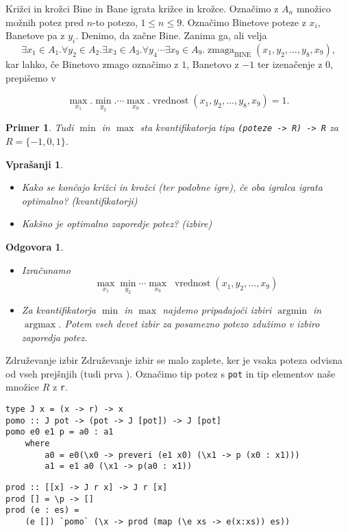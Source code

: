 \documentclass{beamer}
\newtheorem{vpr}{Vprašanji}
\newtheorem{odg}{Odgovora}
\newtheorem{prim}{Primer}
\def\obs{\exists}
\def\fora{\forall}
\newcommand{\argmin}{\operatorname{argmin}}
\newcommand{\argmax}{\operatorname{argmax}}
\begin{document}
\begin{frame}{Križci in krožci}
Bine in Bane igrata križce in krožce. Označimo z $A_n$ množico možnih potez pred $n$-to potezo, $1\leq n\leq 9$.
Označimo Binetove poteze z $x_i$, Banetove pa z $y_i$. Denimo, da začne Bine.  Zanima ga, ali velja
$$\obs x_1\in A_1.\fora y_2 \in A_2. \obs x_3\in A_3.\fora y_4 \cdots \obs x_9 \in A_9. \operatorname{zmaga}_\text{BINE}(x_1,y_2,\dots, y_8,x_9) \text{,}$$
\pause
kar lahko, če Binetovo zmago označimo z $1$, Banetovo z $-1$ ter izenačenje z $0$, prepišemo v

$$\max_{x_1}. \min_{y_2}. \cdots \max_{x_9}. \operatorname{vrednost}(x_1, y_2,\dots, y_8, x_9) = 1\text{.}$$

\begin{prim}
Tudi $\min$ in $\max$ sta kvantifikatorja tipa \texttt{(poteze -> R) -> R} za $R = \{-1, 0, 1\}$.
\end{prim}

\end{frame}

\begin{frame}
\begin{vpr}
	\begin{itemize}
	\item Kako se končajo križci in krožci (ter podobne igre), če oba igralca igrata optimalno? (kvantifikatorji)
	\item Kakšno je optimalno zaporedje potez? (izbire)
	\end{itemize}
\end{vpr}
\pause
\begin{odg}
	\begin{itemize}
	\item Izračunamo $$\max_{x_1}\min_{y_2}\cdots \max_{x_9}\;\operatorname{vrednost}(x_1, y_2,\dots, x_9)$$
	\item Za kvantifikatorja $\min$ in $\max$ najdemo pripadajoči izbiri $\argmin$ in $\argmax$. Potem vseh devet izbir
	za posamezno potezo zdužimo v izbiro zaporedja potez.
	\end{itemize}
\end{odg}

\end{frame}

\begin{frame}[fragile]{Združevanje izbir}%
Združevanje izbir se malo zaplete, ker je vsaka poteza odvisna od vseh prejšnjih (tudi prva \smiley).
Označimo tip potez s \texttt{pot} in tip elementov naše množice $R$ z \texttt{r}.
\begin{lstlisting}
type J x = (x -> r) -> x
pomo :: J pot -> (pot -> J [pot]) -> J [pot]
pomo e0 e1 p = a0 : a1
    where
        a0 = e0(\x0 -> preveri (e1 x0) (\x1 -> p (x0 : x1)))
        a1 = e1 a0 (\x1 -> p(a0 : x1))
\end{lstlisting}

\begin{lstlisting}
prod :: [[x] -> J r x] -> J r [x]
prod [] = \p -> []
prod (e : es) =  
    (e []) `pomo` (\x -> prod (map (\e xs -> e(x:xs)) es))
\end{lstlisting}
\end{frame}
\end{document}

